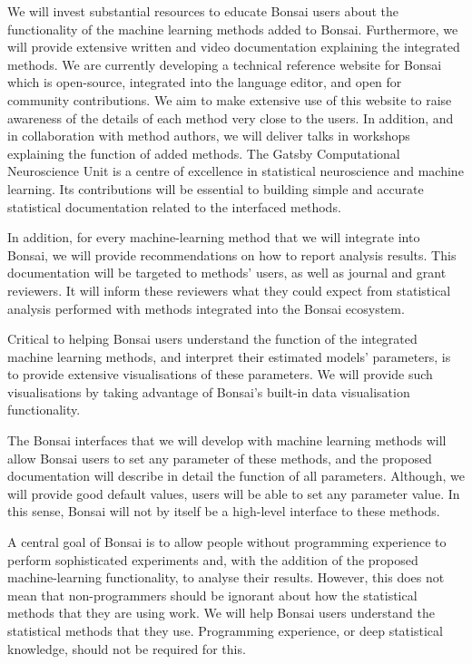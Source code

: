 \documentclass[11pt]{letter}
\begin{document}
\begin{letter}{
}
We will invest substantial resources to educate Bonsai users about the
functionality of the machine learning methods added to Bonsai. Furthermore, we will provide
extensive written and video documentation explaining the integrated methods. We are currently developing a technical reference  website for Bonsai which is open-source, integrated into the language editor, and open for community contributions. We aim to make extensive use of this website to raise awareness of the details of each method very close to the users.  In
addition, and in collaboration with method authors, we will deliver talks in
workshops explaining the function of added methods.
%
The Gatsby Computational Neuroscience Unit is a centre of excellence in
statistical neuroscience and machine learning. Its contributions will be
essential to building simple and accurate statistical documentation related to
the interfaced methods.

In addition, for every machine-learning method that we will integrate into
Bonsai, we will provide recommendations on how to report analysis results.
This documentation will be targeted to methods' users, as well as journal and
grant reviewers. It will inform these reviewers what they could expect from
statistical analysis performed with methods integrated into the Bonsai
ecosystem.

Critical to helping Bonsai users understand the function of the integrated machine
learning methods, and interpret their estimated models' parameters, is to
provide extensive visualisations of these parameters. We will provide such
visualisations by taking advantage of Bonsai's built-in data visualisation functionality.

The Bonsai interfaces that we will develop with machine learning methods will
allow Bonsai users to set any parameter of these methods, and the proposed
documentation will describe in detail the function of all parameters. Although,
we will provide good default values, users will be able to set any parameter
value. In this sense, Bonsai will not by itself be a high-level interface to these
methods.

A central goal of Bonsai is to allow people without programming experience to
perform sophisticated experiments and, with the addition of the proposed
machine-learning functionality, to analyse their results. However, this does
not mean that non-programmers should be ignorant about how the statistical
methods that they are using work. We will help Bonsai users understand the
statistical methods that they use. Programming experience, or deep statistical
knowledge, should not be required for this.


\end{letter}
\end{document}
